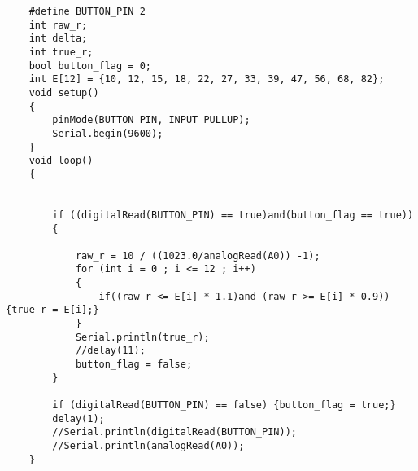 \codeExample

\begin{verbatim}
    #define BUTTON_PIN 2
    int raw_r;
    int delta;
    int true_r;
    bool button_flag = 0;
    int E[12] = {10, 12, 15, 18, 22, 27, 33, 39, 47, 56, 68, 82};
    void setup()
    {
        pinMode(BUTTON_PIN, INPUT_PULLUP);
        Serial.begin(9600);     
    }
    void loop()
    {
        

        if ((digitalRead(BUTTON_PIN) == true)and(button_flag == true))
        {
            
            raw_r = 10 / ((1023.0/analogRead(A0)) -1);
            for (int i = 0 ; i <= 12 ; i++)
            {
                if((raw_r <= E[i] * 1.1)and (raw_r >= E[i] * 0.9)) {true_r = E[i];}
            }
            Serial.println(true_r);
            //delay(11);
            button_flag = false;
        }
        
        if (digitalRead(BUTTON_PIN) == false) {button_flag = true;}
        delay(1);
        //Serial.println(digitalRead(BUTTON_PIN));
        //Serial.println(analogRead(A0));
    }
\end{verbatim}